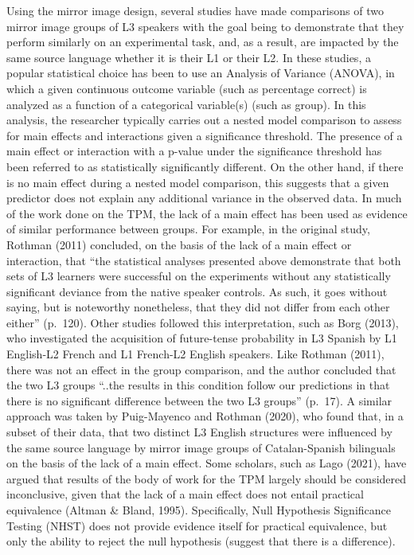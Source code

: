 \documentclass[
  man,floatsintext]{apa6}
\begin{document}
Using the mirror image design, several studies have made comparisons of two mirror image groups of L3 speakers with the goal being to demonstrate that they perform similarly on an experimental task, and, as a result, are impacted by the same source language whether it is their L1 or their L2.
In these studies, a popular statistical choice has been to use an Analysis of Variance (ANOVA), in which a given continuous outcome variable (such as percentage correct) is analyzed as a function of a categorical variable(s) (such as group).
In this analysis, the researcher typically carries out a nested model comparison to assess for main effects and interactions given a significance threshold.
The presence of a main effect or interaction with a p-value under the significance threshold has been referred to as statistically significantly different.
On the other hand, if there is no main effect during a nested model comparison, this suggests that a given predictor does not explain any additional variance in the observed data.
In much of the work done on the TPM, the lack of a main effect has been used as evidence of similar performance between groups.
For example, in the original study, Rothman (2011) concluded, on the basis of the lack of a main effect or interaction, that ``the statistical analyses presented above demonstrate that both sets of L3 learners were successful on the experiments without any statistically significant deviance from the native speaker controls. As such, it goes without saying, but is noteworthy nonetheless, that they did not differ from each other either'' (p.~120).
Other studies followed this interpretation, such as Borg (2013), who investigated the acquisition of future-tense probability in L3 Spanish by L1 English-L2 French and L1 French-L2 English speakers.
Like Rothman (2011), there was not an effect in the group comparison, and the author concluded that the two L3 groups ``..the results in this condition follow our predictions in that there is no significant difference between the two L3 groups'' (p.~17).
A similar approach was taken by Puig-Mayenco and Rothman (2020), who found that, in a subset of their data, that two distinct L3 English structures were influenced by the same source language by mirror image groups of Catalan-Spanish bilinguals on the basis of the lack of a main effect.
Some scholars, such as Lago (2021), have argued that results of the body of work for the TPM largely should be considered inconclusive, given that the lack of a main effect does not entail practical equivalence (Altman \& Bland, 1995).
Specifically, Null Hypothesis Significance Testing (NHST) does not provide evidence itself for practical equivalence, but only the ability to reject the null hypothesis (suggest that there is a difference).
\end{document}
